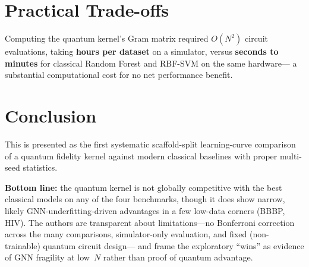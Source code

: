 \documentclass[11pt,a4paper]{article}
\begin{document}
\section*{Practical Trade-offs}
Computing the quantum kernel's Gram matrix required $O(N^2)$ circuit evaluations,
taking \textbf{hours per dataset} on a simulator, versus \textbf{seconds to minutes} for classical Random Forest and RBF-SVM on the same hardware---
a substantial computational cost for no net performance benefit.

\section*{Conclusion}
This is presented as the first systematic scaffold-split learning-curve comparison of a quantum fidelity kernel against modern classical baselines with proper multi-seed statistics.

\textbf{Bottom line:} the quantum kernel is not globally competitive with the best classical models on any of the four benchmarks,
though it does show narrow, likely GNN-underfitting-driven advantages in a few low-data corners (BBBP, HIV).
The authors are transparent about limitations---no Bonferroni correction across the many comparisons, simulator-only evaluation, and fixed (non-trainable) quantum circuit design---
and frame the exploratory ``wins'' as evidence of GNN fragility at low~$N$ rather than proof of quantum advantage.

\vspace{0.6em}
\noindent{}
\end{document}

